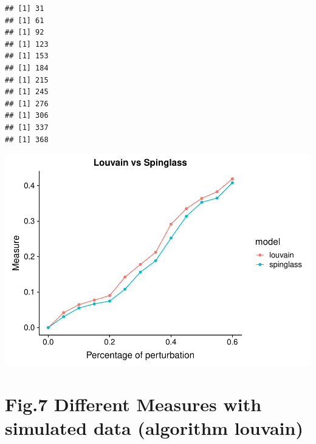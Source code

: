 \documentclass[]{article}
\newenvironment{Shaded}{\begin{snugshade}}{\end{snugshade}}
\newcommand{\KeywordTok}[1]{\textcolor[rgb]{0.13,0.29,0.53}{\textbf{#1}}}
\newcommand{\DataTypeTok}[1]{\textcolor[rgb]{0.13,0.29,0.53}{#1}}
\newcommand{\StringTok}[1]{\textcolor[rgb]{0.31,0.60,0.02}{#1}}
\newcommand{\OperatorTok}[1]{\textcolor[rgb]{0.81,0.36,0.00}{\textbf{#1}}}
\newcommand{\NormalTok}[1]{#1}
\begin{document}
\begin{verbatim}
## [1] 31
## [1] 61
## [1] 92
## [1] 123
## [1] 153
## [1] 184
## [1] 215
## [1] 245
## [1] 276
## [1] 306
## [1] 337
## [1] 368
\end{verbatim}

\begin{Shaded}
\end{Shaded}

\includegraphics{Figure_Paper_files/figure-latex/unnamed-chunk-4-7.pdf}

\section{Fig.7 Different Measures with simulated data (algorithm
louvain)}\label{fig.7-different-measures-with-simulated-data-algorithm-louvain}
\end{document}
